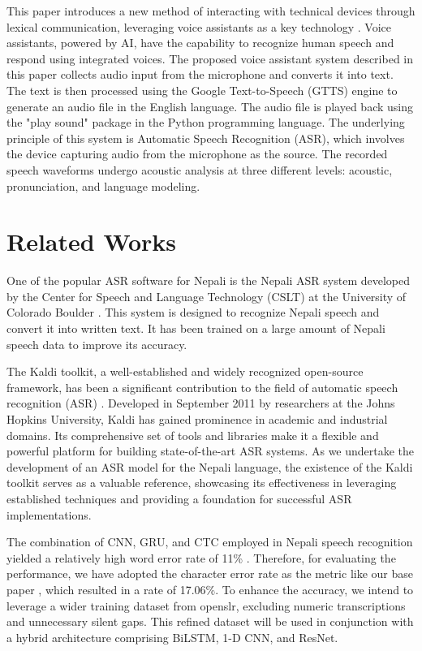 This paper introduces a new method of interacting with technical devices through lexical communication, leveraging voice assistants as a key technology \cite{subhash2020artificial}. Voice assistants, powered by AI, have the capability to recognize human speech and respond using integrated voices. The proposed voice assistant system described in this paper collects audio input from the microphone and converts it into text. The text is then processed using the Google Text-to-Speech (GTTS) engine to generate an audio file in the English language. The audio file is played back using the "play sound" package in the Python programming language. The underlying principle of this system is Automatic Speech Recognition (ASR), which involves the device capturing audio from the microphone as the source. The recorded speech waveforms undergo acoustic analysis at three different levels: acoustic, pronunciation, and language modeling.

\section{Related Works}

One of the popular ASR software for Nepali is the Nepali ASR system developed by the Center for Speech and Language Technology (CSLT) at the University of Colorado Boulder \cite{websiteColorado}. This system is designed to recognize Nepali speech and convert it into written text. It has been trained on a large amount of Nepali speech data to improve its accuracy.

The Kaldi toolkit, a well-established and widely recognized open-source framework, has been a significant contribution to the field of automatic speech recognition (ASR) \cite{githubkaldi}. Developed in September 2011 by researchers at the Johns Hopkins University, Kaldi has gained prominence in academic and industrial domains. Its comprehensive set of tools and libraries make it a flexible and powerful platform for building state-of-the-art ASR systems. As we undertake the development of an ASR model for the Nepali language, the existence of the Kaldi toolkit serves as a valuable reference, showcasing its effectiveness in leveraging established techniques and providing a foundation for successful ASR implementations.

The combination of CNN, GRU, and CTC employed in Nepali speech recognition yielded a relatively high word error rate of 11\% \cite{bhatta2020nepali}. Therefore, for evaluating the performance, we have adopted the character error rate as the metric like our base paper \cite{dhakal2022automatic}, which resulted in a rate of 17.06\%. To enhance the accuracy, we intend to leverage a wider training dataset from openslr, excluding numeric transcriptions and unnecessary silent gaps. This refined dataset will be used in conjunction with a hybrid architecture comprising BiLSTM, 1-D CNN, and ResNet.

